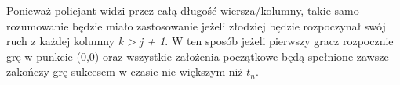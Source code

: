 \documentclass[brudnopis]{xmgr}
\newtheorem{Lemat}{Lemat}
\begin{document}
\indent Ponieważ policjant widzi przez całą długość wiersza/kolumny, takie samo rozumowanie będzie miało zastosowanie jeżeli złodziej będzie rozpoczynał swój ruch z każdej kolumny \textit{k > j + 1}. W ten sposób jeżeli pierwszy gracz rozpocznie grę w punkcie (0,0) oraz wszystkie założenia początkowe będą spełnione zawsze zakończy grę sukcesem w czasie nie większym niż \textit{$t_n$}.





\end{document}
